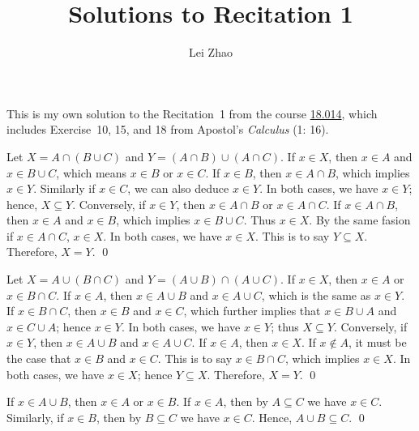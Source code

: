 

\title{\bf Solutions to Recitation 1}
\author{Lei Zhao}


\maketitle
This is my own solution to the Recitation~1 from the course
\href{https://ocw.mit.edu/courses/mathematics/18-014-calculus-with-theory-fall-2010/recitations/}{18.014},
which includes Exercise~10, 15, and 18 from Apostol's \textit{Calculus}
(1: 16).


 {Let
  \(X = A \cap (B \cup C)\) and \(Y = (A \cap B) \cup (A \cap C)\).
  If \(x \in X\), then \(x \in A\) and \(x \in B \cup C\), which means
  \(x \in B\) or \(x \in C\).  If \(x \in B\), then
  \(x \in A \cap B\), which implies \(x \in Y\).  Similarly if
  \(x \in C\), we can also deduce \(x \in Y\).  In both cases, we have
  \(x \in Y\); hence, \(X \subseteq Y\).  Conversely, if \(x \in Y\),
  then \(x \in A \cap B\) or \(x \in A \cap C\).  If
  \(x \in A \cap B\), then \(x \in A\) and \(x \in B\), which implies
  \(x \in B \cup C\). Thus \(x \in X\).  By the same fasion if
  \(x \in A \cap C\), \(x \in X\).  In both cases, we have
  \(x \in X\).  This is to say \(Y \subseteq X\).  Therefore,
  \(X = Y\). \qed}

{\parasp Let \(X = A \cup (B \cap C)\) and
  \(Y = (A \cup B) \cap (A \cup C)\).  If \(x \in X\), then
  \(x \in A\) or \(x \in B \cap C\).  If \(x \in A\), then
  \(x \in A \cup B\) and \(x \in A \cup C\), which is the same as
  \(x \in Y\).  If \(x \in B \cap C\), then \(x \in B\) and
  \(x \in C\), which further implies that \(x \in B \cup A\) and
  \(x \in C \cup A\); hence \(x \in Y\).  In both cases, we have
  \(x \in Y\); thus \(X \subseteq Y\).  Conversely, if \(x \in Y\),
  then \(x \in A \cup B\) and \(x \in A \cup C\).  If \(x \in A\),
  then \(x \in X\).  If \(x \notin A\), it must be the case that
  \(x \in B\) and \(x \in C\).  This is to say \(x \in B \cap C\),
  which implies \(x \in X\).  In both cases, we have \(x \in X\);
  hence \(Y \subseteq X\).  Therefore, \(X = Y\). \qed}

  {If \(x \in A \cup B\), then \(x \in A\)
  or \(x \in B\).  If \(x \in A\), then by \(A \subseteq C\) we have
  \(x \in C\).  Similarly, if \(x \in B\), then by \(B \subseteq C\)
  we have \(x \in C\).  Hence, \(A \cup B \subseteq C\). \qed}


